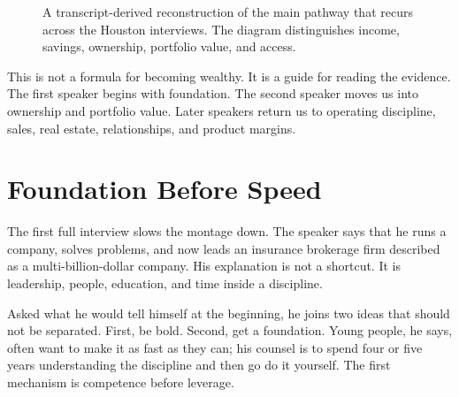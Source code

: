 \begin{figure}
\centering
{}
\caption{A transcript-derived reconstruction of the main pathway that recurs across the Houston interviews. The diagram distinguishes income, savings, ownership, portfolio value, and access.}
\end{figure}

This is not a formula for becoming wealthy. It is a guide for reading the evidence. The first speaker begins with foundation. The second speaker moves us into ownership and portfolio value. Later speakers return us to operating discipline, sales, real estate, relationships, and product margins.

\section{Foundation Before Speed}

The first full interview slows the montage down. The speaker says that he runs a company, solves problems, and now leads an insurance brokerage firm described as a multi-billion-dollar company. His explanation is not a shortcut. It is leadership, people, education, and time inside a discipline.

Asked what he would tell himself at the beginning, he joins two ideas that should not be separated. First, be bold. Second, get a foundation. Young people, he says, often want to make it as fast as they can; his counsel is to spend four or five years understanding the discipline and then go do it yourself. The first mechanism is competence before leverage.

